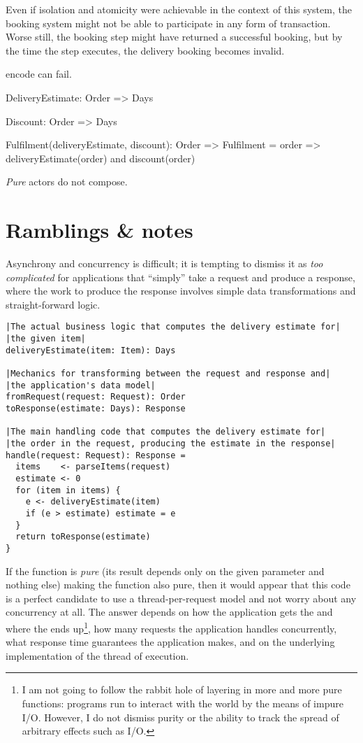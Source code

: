 \documentclass[10 pt, twocolumn]{article}
\begin{document}
Even if isolation and atomicity were achievable in the context of this system, the  booking system might not be able to participate in any form of transaction. Worse still, the  booking step might have returned a successful booking, but by the time the  step executes, the delivery booking becomes invalid.

encode can fail.

DeliveryEstimate: Order => Days

Discount: Order => Days

Fulfilment(deliveryEstimate, discount): Order => Fulfilment =
  order =>
    deliveryEstimate(order) and discount(order)

\emph{Pure} actors do not compose. 


\section{Ramblings \& notes}
Asynchrony and concurrency is difficult; it is tempting to dismiss it as \emph{too complicated} for applications that ``simply'' take a request and produce a response, where the work to produce the response involves simple data transformations and straight-forward logic.

\begin{lstlisting}[caption={Delivery estimate}, label={code:delivery-estimate}, language=Pseudo, escapechar=|]
|The actual business logic that computes the delivery estimate for|
|the given item|
deliveryEstimate(item: Item): Days

|Mechanics for transforming between the request and response and|
|the application's data model|
fromRequest(request: Request): Order
toResponse(estimate: Days): Response

|The main handling code that computes the delivery estimate for|
|the order in the request, producing the estimate in the response|
handle(request: Request): Response = 
  items    <- parseItems(request)
  estimate <- 0
  for (item in items) {
    e <- deliveryEstimate(item)
    if (e > estimate) estimate = e
  }
  return toResponse(estimate)
}
\end{lstlisting}

If the  function is \emph{pure} (its result depends only on the given parameter and nothing else) making the  function also pure, then it would appear that this code is a perfect candidate to use a thread-per-request model and not worry about any concurrency at all. The answer depends on how the application gets the  and where the  ends up\footnote{I am not going to follow the rabbit hole of layering in more and more pure functions: programs run to interact with the world by the means of impure I/O. However, I do not dismiss purity or the ability to track the spread of arbitrary effects such as I/O.}, how many requests the application handles concurrently, what response time guarantees the application makes, and on the underlying implementation of the thread of execution.
\end{document}
